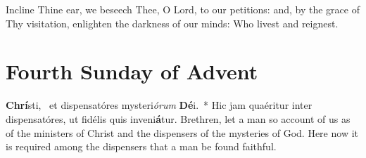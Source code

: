 {
{Incline Thine ear, we beseech Thee, O Lord, to our petitions: and, by the grace of Thy visitation, enlighten the darkness of our minds: Who livest and reignest.}

\bigskip
\benedicamusdomino{}
}











{
\section{Fourth Sunday of Advent}
\subtitle{1st Class}

\deusinadjutorium{}
\def\gabcfolder{../Advent4}

\bigskip
{
\def\anttranslation{Blow ye the trumpet in Sion, for the day of the Lord is near: behold He shall come to save us, alleluia, alleluia.}
}
\bigskip
{\def\anttranslation{Behold the Desired of all nations shall come: and the house of the Lord shall be filled with glory, alleluia.}
\def\noeuouae{T}
}
\bigskip
{}
{\def\anttranslation{The crooked shall become straight, and the rough ways plain: come, O Lord, and tarry not, alleluia.}
\def\dontrepeatantiphon{T}
}
\bigskip
{}
{
\def\anttranslation{The Lord shall come, go forth to meet Him, saying: Great is His sovereignty, and of His kingdom there shall be no end: God the mighty, the Lord, the Prince of peace, alleluia, alleluia.}
\def\dontrepeatantiphon{T}
}
\bigskip
{%
\def\anttranslation{Thine almighty Word, O Lord, shall come forth from Thy royal throne, alleluia.}
}
{}
\printchapter
{ \textbf{Chrí}\-sti,~\gredagger{} et dispensatóres mys\-te\-ri\-\emph{ó\-rum} \textbf{Dé}\-i.~* Hic jam quaéritur inter dispensatóres, ut fidélis quis in\-ve\-ni\-\textbf{á}\-tur.}
{Brethren, let a man so account of us as of the ministers of Christ and the dispensers of the mysteries of God.  Here now it is required among the dispensers that a man be found faithful.}

}
